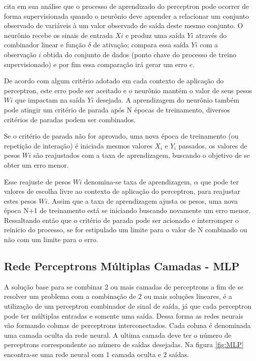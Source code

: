 \cite{Almeida2013} cita em sua análise que o processo de aprendizado do perceptron pode ocorrer de forma supervisionada quando o neurônio deve aprender a relacionar um conjunto observado de variáveis à um valor observado de saída deste mesmo conjunto. O neurônio recebe os sinais de entrada $Xi$ e produz uma saída $Yi$ através do combinador linear e função $\delta$ de ativação; compara essa saída $Yi$ com a observação $i$ obtida do conjunto de dados (ponto chave do processo de treino supervisionado) e por fim essa comparação irá gerar um erro $e$.
            
De acordo com algum critério adotado em cada contexto de aplicação do perceptron, este erro pode ser aceitado e o neurônio mantém o valor de seus pesos $Wi$ que impactam na saída $Yi$ desejada. A aprendizagem do neurônio também pode atingir um critério de parada após N épocas de treinamento, diversos critérios de paradas  podem ser combinados.  
            	
Se o critério de parada não for aprovado, uma nova época de treinamento (ou repetição de interação) é iniciada mesmos valores $X_i$ e $Y_i$ passados, os valores de pesos $Wi$ são reajustados com a taxa de aprendizagem, buscando o objetivo de se obter um erro menor.
            	
Esse reajuste de pesos $Wi$ denomina-se taxa de aprendizagem, $\alpha$ que pode ter valores de escolha livre ao contexto de aplicação do perceptron, para reajustar estes pesos $Wi$. Assim que a taxa de aprendizagem ajusta os pesos, uma nova época N+1 de treinamento está se iniciando buscando novamente um erro menor. Ressaltando então que o critério de parada pode ser acionado e interromper o reinicio do processo, se for estipulado um limite para o valor de N combinado ou não com um limite para o erro. 
            	
\subsection{Rede Perceptrons Múltiplas Camadas - MLP}
  	       
  	       A solução base para se combinar 2 ou mais camadas de perceptrons a fim de se resolver um problema com a combinação de 2 ou mais soluções lineares, é a utilização de um perceptron combinador de sinal de saída, já que cada perceptron pode ter múltiplas entradas e somente uma saída. Dessa forma as redes neurais vão formando colunas de perceptrons interconectados. Cada coluna é denominada uma camada oculta da rede neural. A ultima camada deve ter o número de perceptrons correspondente ao número de saídas desejadas. Na figura \ref{fig:MLP} encontra-se uma rede neural com 1 camada oculta e 2 saídas.
  	       
